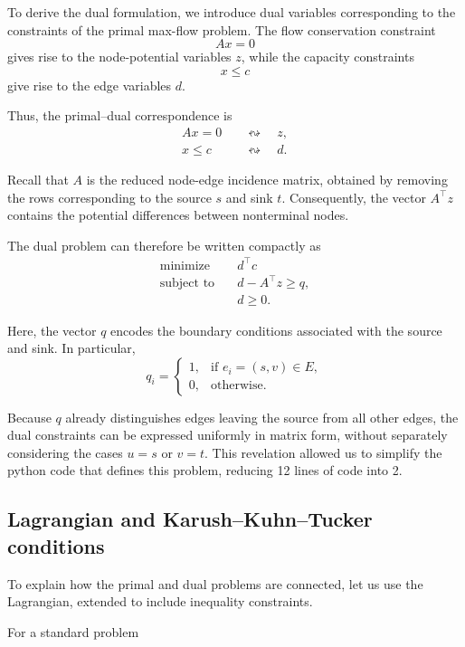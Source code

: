 \documentclass[12pt, openany]{article}
\begin{document}
To derive the dual formulation, we introduce dual variables corresponding to the constraints of the primal max-flow problem. The flow conservation constraint
\[
Ax = 0
\]
gives rise to the node-potential variables \(z\), while the capacity constraints
\[
x \le c
\]
give rise to the edge variables \(d\).

Thus, the primal--dual correspondence is
\[
\begin{aligned}
Ax = 0
&\quad \leftrightsquigarrow \quad z, \\
x \le c
&\quad \leftrightsquigarrow \quad d .
\end{aligned}
\]

Recall that \(A\) is the reduced node-edge incidence matrix, obtained by removing the rows corresponding to the source \(s\) and sink \(t\). Consequently, the vector \(A^\top z\) contains the potential differences between nonterminal nodes.

The dual problem can therefore be written compactly as
\[
\begin{aligned}
\text{minimize} \quad & d^\top c \\
\text{subject to} \quad
& d - A^\top z \ge q, \\
& d \ge 0 .
\end{aligned}
\]

Here, the vector \(q\) encodes the boundary conditions associated with the source and sink. In particular,
\[
q_i =
\begin{cases}
1, & \text{if } e_i=(s,v)\in E, \\[2pt]
0, & \text{otherwise.}
\end{cases}
\]

Because \(q\) already distinguishes edges leaving the source from all other edges, the dual constraints can be expressed uniformly in matrix form, without separately considering the cases \(u=s\) or \(v=t\). This revelation allowed us to simplify the python code that defines this problem, reducing 12 lines of code into 2.

\subsection{Lagrangian and Karush–Kuhn–Tucker conditions}\label{sec:lagrangian_kkt}

To explain how the primal and dual problems are connected, let us use the Lagrangian, extended to include inequality constraints.

For a standard problem
\end{document}
